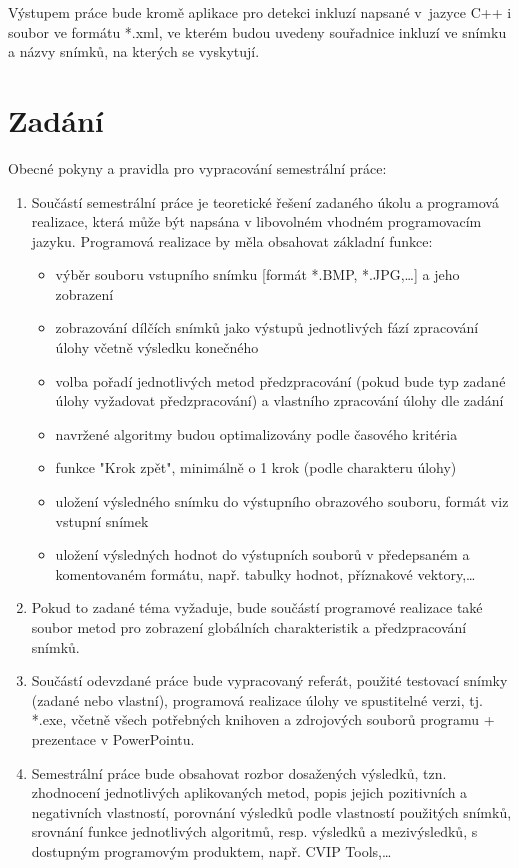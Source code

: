 \documentclass[12pt, a4paper]{report}
\begin{document}
Výstupem práce bude kromě aplikace pro detekci inkluzí napsané v~jazyce C++ i soubor ve formátu *.xml, ve kterém budou uvedeny souřadnice inkluzí ve snímku a názvy snímků, na kterých se vyskytují.

\chapter{Zadání}
Obecné pokyny a pravidla pro vypracování semestrální práce:
\begin{enumerate}
	\item Součástí semestrální práce je teoretické řešení zadaného úkolu a programová realizace, která může být napsána v libovolném vhodném programovacím jazyku. Programová realizace by měla obsahovat základní funkce:
	\begin{itemize}
		\item{výběr souboru vstupního snímku [formát *.BMP, *.JPG,…] a jeho zobrazení}
		\item{zobrazování dílčích snímků jako výstupů jednotlivých fází zpracování úlohy včetně výsledku konečného}
		\item{volba pořadí jednotlivých metod předzpracování (pokud bude typ zadané úlohy vyžadovat
předzpracování) a vlastního zpracování úlohy dle zadání}
		\item{navržené algoritmy budou optimalizovány podle časového kritéria}
		\item{funkce "Krok zpět", minimálně o 1 krok (podle charakteru úlohy)}
		\item{uložení výsledného snímku do výstupního obrazového souboru, formát viz vstupní snímek}
		\item{uložení výsledných hodnot do výstupních souborů v předepsaném a komentovaném formátu,
např. tabulky hodnot, příznakové vektory,…}
	\end{itemize}
\item{Pokud to zadané téma vyžaduje, bude součástí programové realizace také soubor metod pro
zobrazení globálních charakteristik a předzpracování snímků.}		
\item{Součástí odevzdané práce bude vypracovaný referát, použité testovací snímky (zadané nebo
vlastní), programová realizace úlohy ve spustitelné verzi, tj. *.exe, včetně všech potřebných
knihoven a zdrojových souborů programu + prezentace v PowerPointu.}
\item{Semestrální práce bude obsahovat rozbor dosažených výsledků, tzn. zhodnocení jednotlivých
aplikovaných metod, popis jejich pozitivních a negativních vlastností, porovnání výsledků podle
vlastností použitých snímků, srovnání funkce jednotlivých algoritmů, resp. výsledků
a mezivýsledků, s dostupným programovým produktem, např. CVIP Tools,…}
\end{enumerate}
\end{document}
